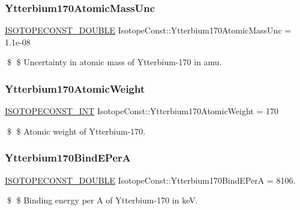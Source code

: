 \subsubsection{\texorpdfstring{Ytterbium170\+Atomic\+Mass\+Unc}{Ytterbium170AtomicMassUnc}}
{\footnotesize\ttfamily \mbox{\hyperlink{group___isotope_const-_macros_ga8f45a7272ce02c0b4c65c44636ed719a}{I\+S\+O\+T\+O\+P\+E\+C\+O\+N\+S\+T\+\_\+\+D\+O\+U\+B\+LE}} Isotope\+Const\+::\+Ytterbium170\+Atomic\+Mass\+Unc = 1.\+1e-\/08}

\$ \$ Uncertainty in atomic mass of Ytterbium-\/170 in amu. \mbox{\label{group___isotope_const-_ytterbium-_yb170_ga9feaf39bdd0b8164490d741aa9ca1968}} 
\subsubsection{\texorpdfstring{Ytterbium170\+Atomic\+Weight}{Ytterbium170AtomicWeight}}
{\footnotesize\ttfamily \mbox{\hyperlink{group___isotope_const-_macros_ga5f18360b3e99483a35c32d789e62621c}{I\+S\+O\+T\+O\+P\+E\+C\+O\+N\+S\+T\+\_\+\+I\+NT}} Isotope\+Const\+::\+Ytterbium170\+Atomic\+Weight = 170}

\$ \$ Atomic weight of Ytterbium-\/170. \mbox{\label{group___isotope_const-_ytterbium-_yb170_gadd649549b9128035a2d32fda8400544d}} 
\subsubsection{\texorpdfstring{Ytterbium170\+Bind\+E\+PerA}{Ytterbium170BindEPerA}}
{\footnotesize\ttfamily \mbox{\hyperlink{group___isotope_const-_macros_ga8f45a7272ce02c0b4c65c44636ed719a}{I\+S\+O\+T\+O\+P\+E\+C\+O\+N\+S\+T\+\_\+\+D\+O\+U\+B\+LE}} Isotope\+Const\+::\+Ytterbium170\+Bind\+E\+PerA = 8106.}

\$ \$ Binding energy per A of Ytterbium-\/170 in keV. \mbox{\label{group___isotope_const-_ytterbium-_yb170_ga22f5b88e37b704ec47f4d8b84aa3894c}} 
